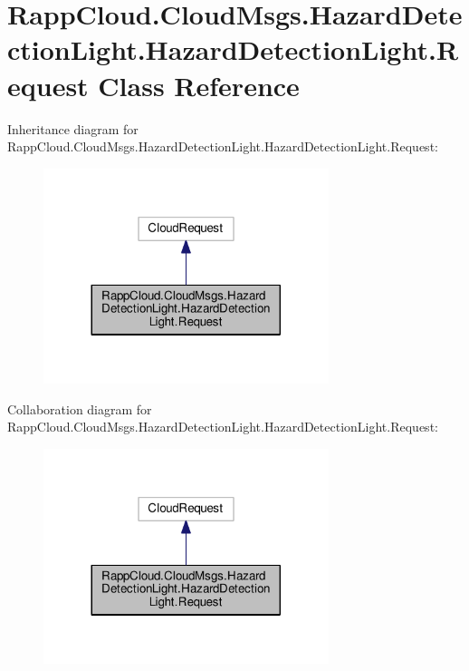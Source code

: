 \hypertarget{classRappCloud_1_1CloudMsgs_1_1HazardDetectionLight_1_1HazardDetectionLight_1_1Request}{\section{Rapp\-Cloud.\-Cloud\-Msgs.\-Hazard\-Detection\-Light.\-Hazard\-Detection\-Light.\-Request Class Reference}
\label{classRappCloud_1_1CloudMsgs_1_1HazardDetectionLight_1_1HazardDetectionLight_1_1Request}
}


Inheritance diagram for Rapp\-Cloud.\-Cloud\-Msgs.\-Hazard\-Detection\-Light.\-Hazard\-Detection\-Light.\-Request\-:
\nopagebreak
\begin{figure}[H]
\begin{center}
\leavevmode
\includegraphics[width=236pt]{classRappCloud_1_1CloudMsgs_1_1HazardDetectionLight_1_1HazardDetectionLight_1_1Request__inherit__graph}
\end{center}
\end{figure}


Collaboration diagram for Rapp\-Cloud.\-Cloud\-Msgs.\-Hazard\-Detection\-Light.\-Hazard\-Detection\-Light.\-Request\-:
\nopagebreak
\begin{figure}[H]
\begin{center}
\leavevmode
\includegraphics[width=236pt]{classRappCloud_1_1CloudMsgs_1_1HazardDetectionLight_1_1HazardDetectionLight_1_1Request__coll__graph}
\end{center}
\end{figure}
